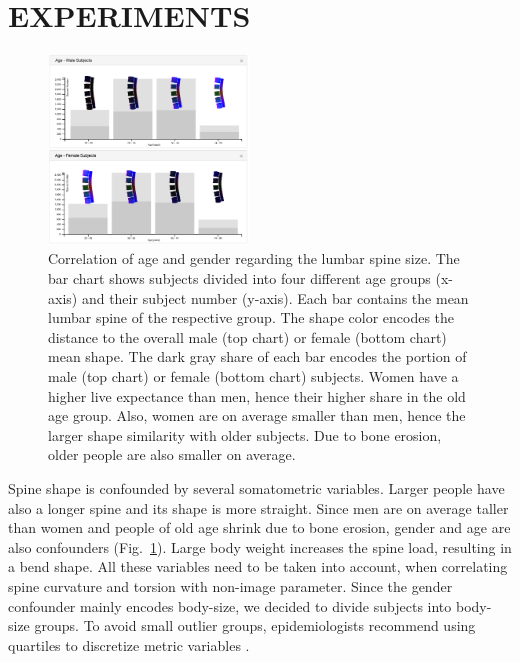 \documentclass[a4paper,twoside]{style/article}
\begin{document}
\section{\uppercase{Experiments}}
\label{sec:Experiments}
\begin{figure}[!h]
  \centering
  \includegraphics[width=0.475\textwidth]{figures/age-gender}
  \caption{
	Correlation of age and gender regarding the lumbar spine size.
	The bar chart shows subjects divided into four different age groups (x-axis) and their subject number (y-axis).
	Each bar contains the mean lumbar spine of the respective group.
	The shape color encodes the distance to the overall male (top chart) or female (bottom chart) mean shape.
	The dark gray share of each bar encodes the portion of male (top chart) or female (bottom chart) subjects.
	Women have a higher live expectance than men, hence their higher share in the old age group.
	Also, women are on average smaller than men, hence the larger shape similarity with older subjects.
	Due to bone erosion, older people are also smaller on average.
	}
  \label{fig:age-gender}
\end{figure}
\noindent Spine shape is confounded by several somatometric variables.
Larger people have also a longer spine and its shape is more straight.
Since men are on average taller than women and people of old age shrink due to bone erosion, gender and age are also confounders (Fig.~\ref{fig:age-gender}).
Large body weight increases the spine load, resulting in a bend shape.
All these variables need to be taken into account, when correlating spine curvature and torsion with non-image parameter.
Since the gender confounder mainly encodes body-size, we decided to divide subjects into body-size groups.
To avoid small outlier groups, epidemiologists recommend using quartiles to discretize metric variables \cite{Klemm2014VIS}.
\end{document}
